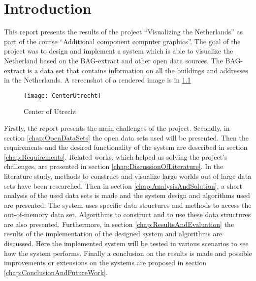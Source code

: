 \chapter{Introduction}
\label{chap:Introduction}
This report presents the results of the project “Visualizing the Netherlands” as part of the course “Additional component computer graphics”. The goal of the project was to design and implement a system which is able to visualize the Netherland based on the BAG-extract \cite{BAG14} and other open data sources. The BAG-extract is a data set that contains information on all the buildings and addresses in the Netherlands. A screenshot of a rendered image is in \ref{fig:utrechtCenter}

\begin{figure}[htb!]
\centering
\texttt{[image: CenterUtrecht]}
\caption{Center of Utrecht}
\label{fig:utrechtCenter}
\end{figure}

Firstly, the report presents the main challenges of the project. Secondly, in section \ref{chap:OpenDataSets} the open data sets used will be presented. Then the requirements and the desired functionality of the system are described in section \ref{chap:Requirements}. Related works, which helped us solving the project’s challenges, are presented in section \ref{chap:DiscussionOfLiterature}. In the literature study, methods to construct and visualize large worlds out of large data sets have been researched. Then in section \ref{chap:AnalysisAndSolution}, a short analysis of the used data sets is made and the system design and algorithms used are presented. The system uses specific data structures and methods to access the out-of-memory data set. Algorithms to construct and to use these data structures are also presented. Furthermore, in section \ref{chap:ResultsAndEvaluation} the results of the implementation of the designed system and algorithms are discussed. Here the implemented system will be tested in various scenarios to see how the system performs. Finally a conclusion on the results is made and possible improvements or extensions on the systems are proposed in section \ref{chap:ConclusionAndFutureWork}.

